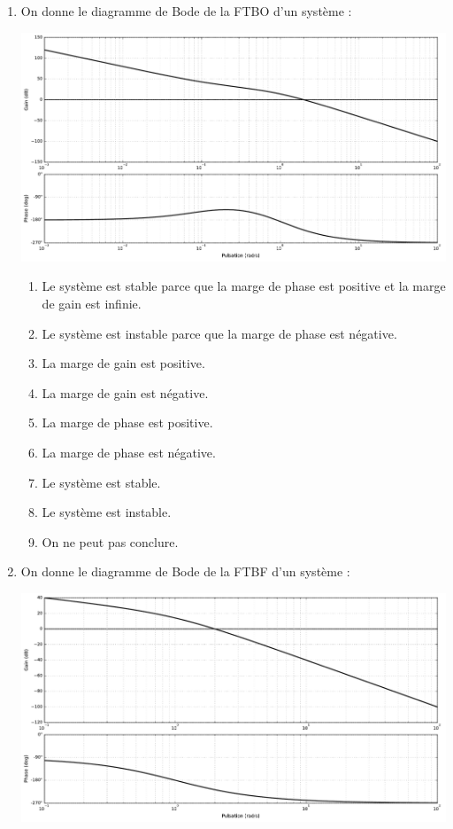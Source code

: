 \documentclass[10pt,fleqn]{article} %
\begin{document}
\begin{multicols}{2}
\begin{enumerate}
\item On donne le diagramme de Bode de la FTBO d'un système : 
\begin{center}
\includegraphics[width=\linewidth]{images/img_02}
\end{center}
\begin{enumerate}
\item Le système est stable parce que la marge de phase est positive et la marge de gain est infinie.
\item Le système est instable parce que la marge de phase est négative.
\item La marge de gain est positive. %
\item La marge de gain est négative.
\item La marge de phase est positive.
\item La marge de phase est négative. %
\item Le système est stable.
\item Le système est instable. %
\item On ne peut pas conclure. %
\end{enumerate}
\item On donne le diagramme de Bode de la FTBF d'un système : 
\begin{center}
\includegraphics[width=\linewidth]{images/img_03}

\end{center}
\end{enumerate}
\end{multicols}
\end{document}
